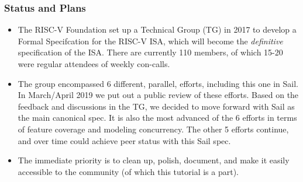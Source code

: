 \documentclass[aspectratio=169]{beamer}
\newcommand{\slidefont}{\scriptsize}
\begin{document}

\begin{frame}
  \frametitle{Status and Plans}

  \slidefont

  \begin{itemize}
  \item
    The RISC-V Foundation set up a Technical Group (TG) in 2017 to
    develop a Formal Specifcation for the RISC-V ISA, which will
    become the \emph{definitive} specification of the ISA.  There are
    currently 110 members, of which 15-20 were regular attendees of
    weekly con-calls.

  \item 
    The group encompassed 6 different, parallel, efforts, including
    this one in Sail.  In March/April 2019 we put out a public review
    of these efforts.  Based on the feedback and discussions in the
    TG, we decided to move forward with Sail as the main canonical
    spec. It is also the most advanced of the 6 efforts in terms of
    feature coverage and modeling concurrency.  The other 5 efforts
    continue, and over time could achieve peer status with this Sail
    spec.

  \item
    The immediate priority is to clean up, polish, document, and make
    it easily accessible to the community (of which this tutorial is a
    part).

  \end{itemize}

\end{frame}

\end{document}

